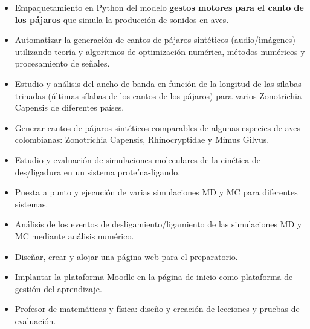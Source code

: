 \documentclass[10pt,letter,ragged2e,withhyper]{altacv}
\begin{document}
\begin{paracol}{2}

\begin{itemize}
\item Empaquetamiento en Python del modelo \textbf{gestos motores para el canto de los pájaros} que simula la producción de sonidos en aves.
\item Automatizar la generación de cantos de pájaros sintéticos (audio/imágenes) utilizando teoría y algoritmos de optimización numérica, métodos numéricos y procesamiento de señales.
\item Estudio y análisis del ancho de banda en función de la longitud de las sílabas trinadas (últimas sílabas de los cantos de los pájaros) para varios Zonotrichia Capensis de diferentes países.
\item Generar cantos de pájaros sintéticos comparables de algunas especies de aves colombianas: Zonotrichia Capensis, Rhinocryptidae y Mimus Gilvus.

\end{itemize}

\divider

\begin{itemize}
\item Estudio y evaluación de simulaciones moleculares de la cinética de des/ligadura en un sistema proteína-ligando.
\item Puesta a punto y ejecución de varias simulaciones MD y MC para diferentes sistemas.
\item Análisis de los eventos de desligamiento/ligamiento de las simulaciones MD y MC mediante análisis numérico.
\end{itemize}

\divider

\begin{itemize}
\item Diseñar, crear y alojar una página web para el preparatorio.
\item Implantar la plataforma Moodle en la página de inicio como plataforma de gestión del aprendizaje.
\item Profesor de matemáticas y física: diseño y creación de lecciones y pruebas de evaluación.
\end{itemize}


\end{paracol}
\end{document}
